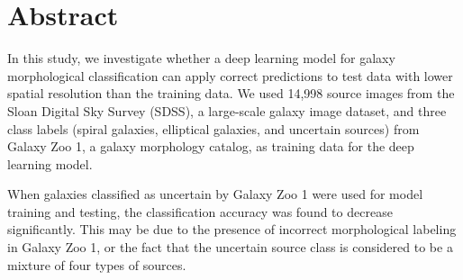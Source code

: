 \documentclass[a4j, 11pt]{jreport}
\begin{document}



\chapter*{Abstract}
In this study, we investigate whether a deep learning model for galaxy morphological classification can apply correct predictions to test data with lower spatial resolution than the training data. We used 14,998 source images from the Sloan Digital Sky Survey (SDSS), a large-scale galaxy image dataset, and three class labels (spiral galaxies, elliptical galaxies, and uncertain sources) from Galaxy Zoo 1, a galaxy morphology catalog, as training data for the deep learning model. 

When galaxies classified as uncertain by Galaxy Zoo 1 were used for model training and testing, the classification accuracy was found to decrease significantly. This may be due to the presence of incorrect morphological labeling in Galaxy Zoo 1, or the fact that the uncertain source class is considered to be a mixture of four types of sources.
\end{document}
